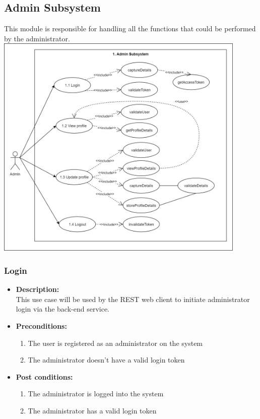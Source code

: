\documentclass[a4paper,10pt]{article}
\begin{document}
\subsection{Admin Subsystem}
This module is responsible for handling all the functions that could be performed by the administrator.
\includegraphics[width=12cm]{Admin_Subsystem_Use_Case.jpg}
\subsubsection{Login}
\begin{itemize}
	\item \textbf {Description:}\\
	This use case will be used by the REST web client to initiate administrator login via the back-end service.
	\item \textbf {Preconditions:}
		\begin{enumerate}
			\item The user is registered as an administrator on the system
			\item The administrator doesn’t have a valid login token
		\end{enumerate}
	\item \textbf {Post conditions:}
		\begin{enumerate}
			\item The administrator is logged into the system
			\item The administrator has a valid login token
		\end{enumerate}
\end{itemize}
\end{document}
